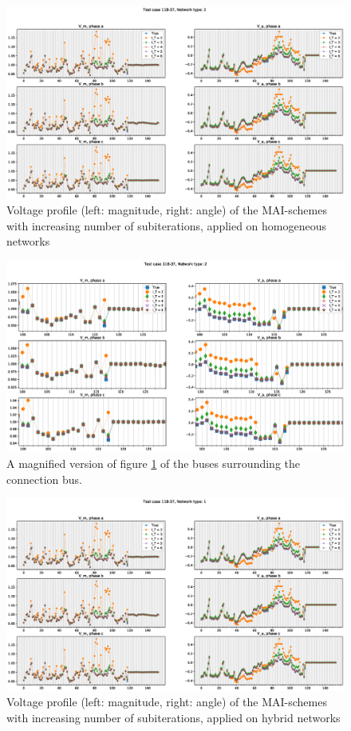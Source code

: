 \begin{figure}[h]
\centering
\includegraphics[width=\textwidth]{Images/MAI_N2.eps}
\caption{Voltage profile (left: magnitude, right: angle) of the MAI-schemes with increasing number of subiterations, applied on homogeneous networks}\label{fig:MAIN2}
\end{figure}
\begin{figure}[h]
\centering
\includegraphics[width=\textwidth]{Images/Z_MAI_N2.eps}
\caption{A magnified version of figure \ref{fig:MAIN2} of the buses surrounding the connection bus.}\label{fig:ZMAIN2}
\end{figure}
\begin{figure}[h]
\centering
\includegraphics[width=\textwidth]{Images/MAI_N1.eps}
\caption{Voltage profile (left: magnitude, right: angle) of the MAI-schemes with increasing number of subiterations, applied on hybrid networks}\label{fig:MAIN1}
\end{figure}
